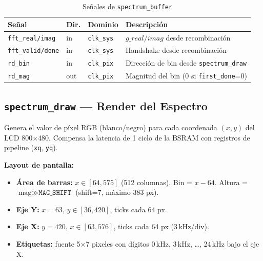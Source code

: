 \documentclass[12pt, a4paper]{article}
\begin{document}
\begin{table}[H]
\centering
\caption{Señales de \texttt{spectrum\_buffer}}
\begin{tabular}{p{3cm} p{3.3cm} p{3.5cm} p{4.5cm}}
\toprule
\textbf{Señal} & \textbf{Dir.} & \textbf{Dominio} & \textbf{Descripción} \\
\midrule
\texttt{fft\_real/imag} & in  & \texttt{clk\_sys} & $g\_real/imag$ desde recombinación \\
\texttt{fft\_valid/done}& in  & \texttt{clk\_sys} & Handshake desde recombinación \\
\texttt{rd\_bin}        & in  & \texttt{clk\_pix} & Dirección de bin desde \texttt{spectrum\_draw} \\
\texttt{rd\_mag}        & out & \texttt{clk\_pix} & Magnitud del bin (0 si \texttt{first\_done}=0) \\
\bottomrule
\end{tabular}
\end{table}

\subsection{\texttt{spectrum\_draw} — Render del Espectro}

Genera el valor de píxel RGB (blanco/negro) para cada coordenada $(x,y)$
del LCD 800$\times$480. Compensa la latencia de 1 ciclo de la BSRAM con
registros de pipeline (\texttt{xq}, \texttt{yq}).

\textbf{Layout de pantalla:}
\begin{itemize}[leftmargin=*]
    \item \textbf{Área de barras:} $x \in [64, 575]$ (512 columnas).
          Bin = $x - 64$. Altura = $\text{mag} \gg \texttt{MAG\_SHIFT}$
          (shift=7, máximo 383 px).
    \item \textbf{Eje Y:} $x = 63$, $y \in [36, 420]$, ticks cada 64 px.
    \item \textbf{Eje X:} $y = 420$, $x \in [63, 576]$, ticks cada 64 px
          (3\,kHz/div).
    \item \textbf{Etiquetas:} fuente 5$\times$7 pixeles con dígitos
          0\,kHz, 3\,kHz, \ldots, 24\,kHz bajo el eje X.
\end{itemize}
\end{document}
